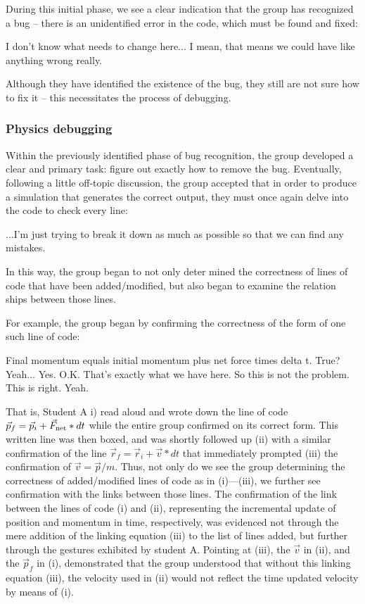 \documentclass{msuphddissertation}
\begin{document}
\begin{doublespace}
During this initial phase, we see a clear indication that the group has recognized a bug -- there is an unidentified error in the code, which must be found and fixed: \begin{description}
\SA I don't know what needs to change here...
\SD  I mean, that means we could have like anything wrong really.\end{description}  Although they have identified the existence of the bug, they still are not sure how to fix it -- this necessitates the
process of debugging.

\subsubsection{Physics debugging}

Within the previously identified phase of bug recognition, the group developed a clear and primary task: figure out exactly how to remove the bug. Eventually, following a little off-topic discussion, the group accepted that in order to produce a simulation that generates the correct output, they must once again delve into the code to check every line:\begin{description}
\SA ...I'm just trying to break it down as much as possible so that we can find any mistakes.\end{description}  In this way, the group began to not only deter mined the correctness of lines of code that have been added/modified, but also began to examine the relation ships between those lines.

For example, the group began by confirming the correctness of the form of one such line of code:\begin{description}
\SA Final momentum equals initial momentum
plus net force times delta t. True?
\SC Yeah...
\SB Yes.
\SA O.K. That's exactly what we have here. So this is not the problem. This is right.
\SD Yeah.\end{description}  That is, Student A i) read aloud and wrote down the
line of code $\vec{p}_{f} = \vec{p}_{i} + \vec{F}_{\rm net}*dt$ while the entire group confirmed on its correct form. This written line was then boxed, and was shortly followed up (ii) with a similar confirmation of the line $\vec{r}_{f} = \vec{r}_{i} + \vec{v}*dt$ that immediately
prompted (iii) the confirmation of $\vec{v} = \vec{p}/m$. Thus, not only do we see the group determining the correctness of added/modified lines of code as in (i)---(iii), we further see confirmation with the links between those lines. The confirmation of the link between the lines of code (i) and (ii), representing the incremental update of position and momentum in time, respectively, was evidenced not through the mere addition of the linking equation (iii) to the list of lines added, but further through the gestures exhibited by student A. Pointing at (iii), the $\vec{v}$ in (ii), and the $\vec{p}_{f}$ in (i), demonstrated that the group understood that without this linking equation (iii), the velocity used in (ii) would not reflect the time updated velocity by means of (i).


\end{doublespace}
\end{document}
